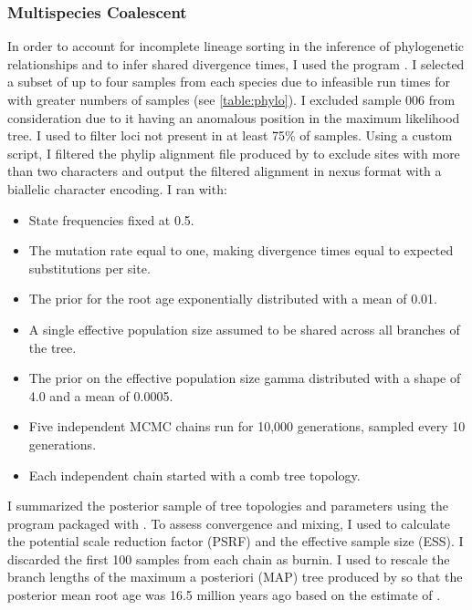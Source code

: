 \subsubsection{Multispecies Coalescent}
In order to account for incomplete lineage sorting in the inference of phylogenetic
relationships and to infer shared divergence times, I used the program \phycoeval \parencite{oaks2022}.
I selected a subset of up to four samples from each species due to
infeasible run times for \phycoeval with greater numbers of samples (see \cref{table:phylo}).
I excluded sample 006 from consideration due to it having an anomalous   
position in the maximum likelihood tree.
I used \pyrad to filter loci not present in at least 75\% of samples. 
Using a custom script, I filtered the phylip alignment file produced by \pyrad 
to exclude sites with more than two characters and output the filtered alignment 
in nexus format with a biallelic character encoding. 
I ran \phycoeval with:
\begin{itemize}
  \item State frequencies fixed at 0.5.
  \item The mutation rate equal to one, making divergence times equal to expected
  substitutions per site.
  \item The prior for the root age exponentially distributed with a mean of 0.01.
  \item A single effective population size assumed to be shared across all branches of the tree.
  \item The prior on the effective population size gamma distributed with a shape 
  of 4.0 and a mean of 0.0005.
  \item Five independent MCMC chains run for 10,000 generations, sampled every 10 generations.
  \item Each independent chain started with a comb tree topology.
\end{itemize}
I summarized the posterior sample of tree topologies and parameters using the 
\sumphycoeval program packaged with \phycoeval \parencite{oaks2022}.
To assess convergence and mixing, I used \sumphycoeval to calculate the
potential scale reduction factor (PSRF) and the effective sample size (ESS).
I discarded the first 100 samples from each chain as burnin.
I used \sumphycoeval to rescale the branch lengths of the maximum a posteriori 
(MAP) tree produced by \sumphycoeval so that the posterior mean root age was 
16.5 million years ago based on the estimate of \textcite{feng2017}.

